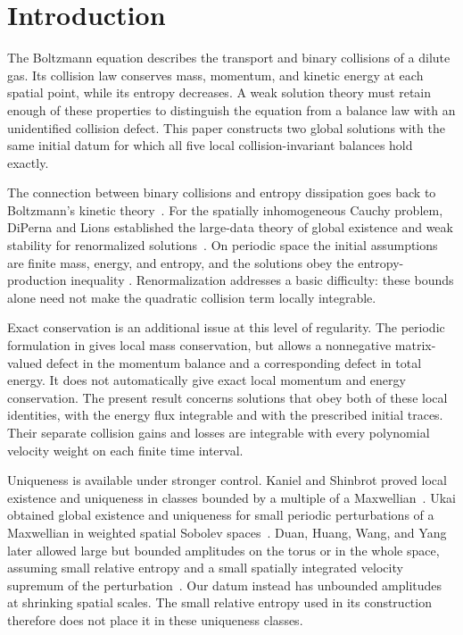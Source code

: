 \section{Introduction}\label{sec:introduction}

The Boltzmann equation describes the transport and binary collisions of a
dilute gas. Its collision law conserves mass, momentum, and kinetic energy
at each spatial point, while its entropy decreases. A weak solution theory
must retain enough of these properties to distinguish the equation from
a balance law with an unidentified collision defect. This paper constructs
two global solutions with the same initial datum for which all five local
collision-invariant balances hold exactly.

The connection between binary collisions and entropy dissipation goes
back to Boltzmann's kinetic theory~\cite{Boltzmann1872}. For the
spatially inhomogeneous Cauchy problem, DiPerna and Lions established
the large-data theory of global existence and weak stability for
renormalized solutions~\cite{DiPernaLions1989}. On periodic space the
initial assumptions are finite mass, energy, and entropy, and the
solutions obey the entropy-production inequality
\cite[Theorem~1 and Remark~2]{DiPernaLions1991}.
Renormalization addresses a basic difficulty: these bounds alone need
not make the quadratic collision term locally integrable.

Exact conservation is an additional issue at this level of regularity.
The periodic formulation in
\cite[Theorem~4.1]{LevermoreMasmoudi2010} gives local mass conservation,
but allows a nonnegative matrix-valued defect in the momentum balance
and a corresponding defect in total energy. It does not automatically
give exact local momentum and energy conservation. The present result
concerns solutions that obey both of these local identities, with the
energy flux integrable and with the prescribed initial traces.
Their separate collision gains and losses are integrable with every
polynomial velocity weight on each finite time interval.

Uniqueness is available under stronger control. Kaniel and Shinbrot
proved local existence and uniqueness in classes bounded by a multiple
of a Maxwellian~\cite{KanielShinbrot1978}. Ukai obtained global
existence and uniqueness for small periodic perturbations of a Maxwellian
in weighted spatial Sobolev spaces~\cite[Theorem~1.2]{Ukai1974}.
Duan, Huang, Wang, and Yang later allowed large but bounded amplitudes
on the torus or in the whole space, assuming small relative entropy and
a small spatially integrated velocity supremum of the
perturbation~\cite[Theorem~1.1]{DuanHuangWangYang2017}.
Our datum instead has unbounded amplitudes at shrinking spatial scales.
The small relative entropy used in its construction therefore does not
place it in these uniqueness classes.

